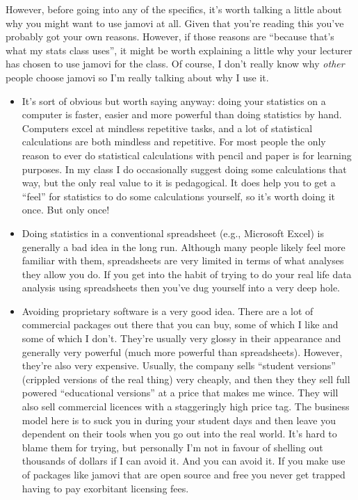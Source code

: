 However, before going into any of the specifics, it's worth talking a little about why you might want to use jamovi at all. Given that you're reading this you've probably got your own reasons. However, if those reasons are ``because that's what my stats class uses'', it might be worth explaining a little why your lecturer has chosen to use jamovi for the class. Of course, I don't really know why {\it other} people choose jamovi so I'm really talking about why I use it.
\begin{itemize}
\item It's sort of obvious but worth saying anyway: doing your statistics on a computer is faster, easier and more powerful than doing statistics by hand. Computers excel at mindless repetitive tasks, and a lot of statistical calculations are both mindless and repetitive. For most people the only reason to ever do statistical calculations with pencil and paper is for learning purposes. In my class I do occasionally suggest doing some calculations that way, but the only real value to it is pedagogical. It does help you to get a ``feel'' for statistics to do some calculations yourself, so it's worth doing it once. But only once!
\item Doing statistics in a conventional spreadsheet (e.g., Microsoft Excel) is generally a bad idea in the long run. Although many people likely feel more familiar with them, spreadsheets are very limited in terms of what analyses they allow you do. If you get into the habit of trying to do your real life data analysis using spreadsheets then you've dug yourself into a very deep hole.
\item Avoiding proprietary software is a very good idea. There are a lot of commercial packages out there that you can buy, some of which I like and some of which I don't. They're usually very glossy in their appearance and generally very powerful (much more powerful than spreadsheets). However, they're also very expensive. Usually, the company sells ``student versions'' (crippled versions of the real thing) very cheaply, and then they they sell full powered ``educational versions'' at a price that makes me wince. They will also sell commercial licences with a staggeringly high price tag. The business model here is to suck you in during your student days and then leave you dependent on their tools when you go out into the real world. It's hard to blame them for trying, but personally I'm not in favour of shelling out thousands of dollars if I can avoid it. And you can avoid it. If you make use of packages like jamovi that are open source and free you never get trapped having to pay exorbitant licensing fees. 

\end{itemize}
